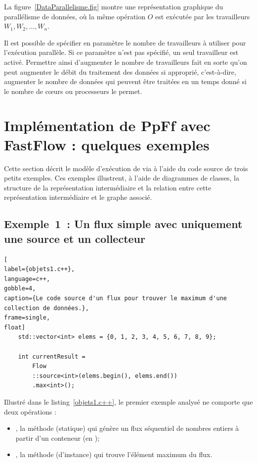 La figure~\ref{DataParallelisme.fig} montre une repr\'esentation graphique du parall\'elisme de donn\'ees, o\`u la m\^eme op\'eration $O$ est ex\'ecut\'ee par les travailleurs $W_1, W_2,\ldots, W_n$. 

Il est possible de sp\'ecifier en param\`etre le nombre de travailleurs \`a utiliser pour l'ex\'ecution parall\`ele. Si ce param\`etre n'est pas sp\'ecifi\'e, un seul travailleur est activ\'e. Permettre ainsi d'augmenter le nombre de travailleurs fait en sorte qu'on peut augmenter le d\'ebit du traitement des donn\'ees si appropri\'e, c'est-\`a-dire, augmenter le nombre de donn\'ees qui peuvent \^etre trait\'ees en un temps donn\'e si le nombre de c\oe{}urs ou processeurs le permet.




\section{Impl\'ementation de {PpFf} avec {FastFlow} : quelques exemples}

Cette section d\'ecrit le mod\`ele d'ex\'ecution de  via  \`a l'aide du code source de trois petits exemples. Ces exemples illustrent, \`a l'aide de diagrammes de classes, la structure de la représentation intermédiaire et la relation entre cette représentation intermédiaire et le graphe  associé.


\subsection{Exemple~1~: Un flux simple avec uniquement une source et un collecteur} 


\begin{lstlisting}[
label={objets1.c++},
language=c++,
gobble=4,
caption={Le code source d'un flux pour trouver le maximum d'une collection de données.},
frame=single,
float]
    std::vector<int> elems = {0, 1, 2, 3, 4, 5, 6, 7, 8, 9};

    int currentResult =
        Flow
        ::source<int>(elems.begin(), elems.end())
        .max<int>();
\end{lstlisting}

Illustr\'e dans le listing~\ref{objets1.c++}, le premier exemple analys\'e ne comporte que deux op\'erations :

\begin{itemize}
\item {}, la méthode (statique) qui g\'en\`ere un flux s\'equentiel de nombres entiers \`a partir d'un conteneur (en ); 
\item {}, la méthode (d'instance) qui trouve l'\'el\'ement maximum du flux. 


\end{itemize}



